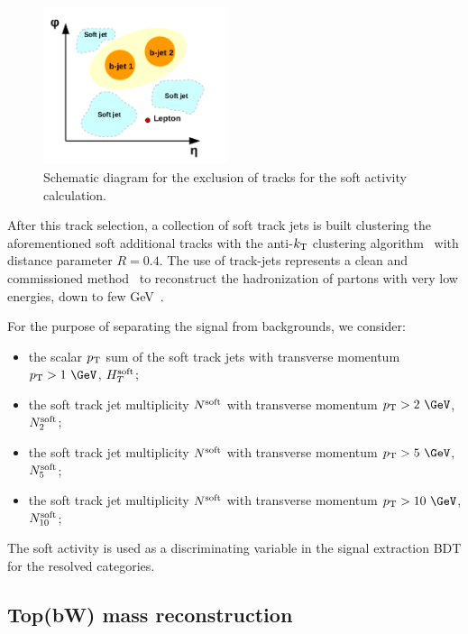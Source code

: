 \begin{figure}[tbp]
  \begin{center}
    \includegraphics[width=0.48\textwidth]{figures/wlnhbb2016/softActivitySchematic.png}
    \caption{Schematic diagram for the exclusion of tracks for the soft activity calculation.}
    \label{fig:softActivity}
  \end{center}
\end{figure}

After this track selection, a collection of soft track jets is built clustering the aforementioned soft additional tracks
with the anti-$k_{\rm T}$ clustering algorithm~\cite{Cacciari:2008gp} with distance parameter $R=0.4$.
The use of track-jets represents a clean and commissioned method~\cite{CMS-PAS-JME-10-006} to reconstruct
the hadronization of partons with very low energies, down to few GeV~\cite{CMS-PAS-JME-08-001}.

For the purpose of separating the signal from backgrounds, we consider:
\begin{itemize}
\item the scalar $p_{\mathrm{T}}$ sum of the soft track jets with transverse momentum $\pt>1~\GeV$, $H_T^{\rm soft}$; 
\item the soft track jet multiplicity $N^{\rm soft}$ with transverse momentum $\pt>2~\GeV$, $N_2^{\rm soft}$;
\item the soft track jet multiplicity $N^{\rm soft}$ with transverse momentum $\pt>5~\GeV$, $N_5^{\rm soft}$;
\item the soft track jet multiplicity $N^{\rm soft}$ with transverse momentum $\pt>10~\GeV$, $N_{10}^{\rm soft}$;
\end{itemize}

The soft activity is used as a discriminating variable in the signal extraction BDT for the resolved categories.


\subsection{Top(bW) mass reconstruction}\label{sec:topmass}

